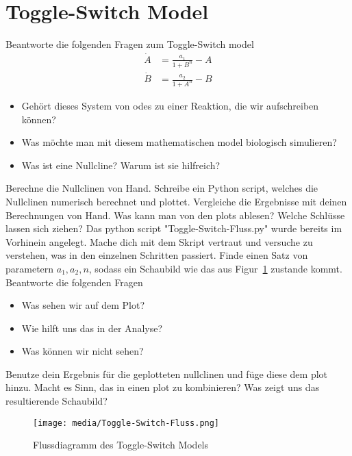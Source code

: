 \section{Toggle-Switch Model}
%
%
Beantworte die folgenden Fragen zum Toggle-Switch model
\begin{align}
    \dot{A} &= \frac{a_1}{1+B^n} - A\\
    \dot{B} &= \frac{a_2}{1+A^n} - B
\end{align}
\begin{itemize}
    \item Gehört dieses System von \acp{ode} zu einer Reaktion, die wir aufschreiben können?
    \item Was möchte man mit diesem mathematischen model biologisch simulieren?
    \item Was ist eine Nullcline? Warum ist sie hilfreich?
\end{itemize}
%
%
Berechne die Nullclinen von Hand.
Schreibe ein Python script, welches die Nullclinen numerisch berechnet und plottet.
Vergleiche die Ergebnisse mit deinen Berechnungen von Hand.
Was kann man von den plots ablesen?
Welche Schlüsse lassen sich ziehen?
%
%
Das python script "Toggle-Switch-Fluss.py" wurde bereits im Vorhinein angelegt.
Mache dich mit dem Skript vertraut und versuche zu verstehen, was in den einzelnen Schritten passiert.
Finde einen Satz von parametern $a_1,a_2,n$, sodass ein Schaubild wie das aus Figur~\ref{fig:toggle-switch-flowdiag} zustande kommt.
Beantworte die folgenden Fragen
\begin{itemize}
    \item Was sehen wir auf dem Plot?
    \item Wie hilft uns das in der Analyse?
    \item Was können wir nicht sehen?
\end{itemize}
Benutze dein Ergebnis für die geplotteten nullclinen und füge diese dem plot hinzu.
Macht es Sinn, das in einen plot zu kombinieren?
Was zeigt uns das resultierende Schaubild?
\begin{figure}[!h]
    \centering
    \texttt{[image: media/Toggle-Switch-Fluss.png]}
    \caption{Flussdiagramm des Toggle-Switch Models}
    \label{fig:toggle-switch-flowdiag}
\end{figure}
%
%